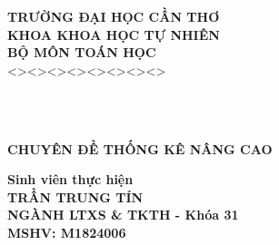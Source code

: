 \documentclass[a4paper,oneside]{../../styles/thesis}
\newlength{\defbaselineskip}
\newcommand{\setlinespacing}[1]%
           {\setlength{\baselineskip}{#1 \defbaselineskip}}
\begin{document}
\newpage


\begin{titlepage}

\hspace{2.8cm} {\bf \fontsize{16pt}{16}\selectfont TRƯỜNG ĐẠI HỌC CẦN THƠ}\\
\vspace*{0.05cm}
\hspace{3.3cm} {\bf\fontsize{16pt}{16}\selectfont KHOA KHOA HỌC TỰ NHIÊN}\\
 \vspace*{0.05cm}
\hspace{4.3cm} {\bf\fontsize{16pt}{16}\selectfont BỘ MÔN TOÁN HỌC}\\
\vspace*{0.05cm}
\hspace{5 cm} <><><><><><><><> 


\vspace*{2cm}

\\
 \vspace*{0.05cm}\\
\vspace*{2cm}

\begin{center}
 {\bf\fontsize{20pt}{28}\selectfont CHUYÊN ĐỀ THỐNG KÊ NÂNG CAO }   
\end{center}




\vspace*{1.5cm}

\begin{center}
\textbf{Sinh viên thực hiện}\\    
\textbf{TRẦN TRUNG TÍN}\\
\textbf{NGÀNH LTXS \& TKTH - Khóa 31}\\
\textbf{MSHV: M1824006}\\
\vspace{1cm}
\end{center}



\vspace*{3cm}
\end{titlepage}

\setlinespacing{1.3}
\end{document}
